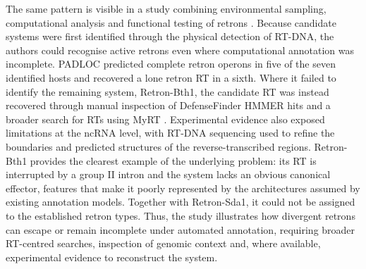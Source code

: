The same pattern is visible in a study combining environmental sampling, computational analysis and functional testing of retrons \cite{nakamura2025}. Because candidate systems were first identified through the physical detection of RT-DNA, the authors could recognise active retrons even where computational annotation was incomplete. PADLOC predicted complete retron operons in five of the seven identified hosts and recovered a lone retron RT in a sixth. Where it failed to identify the remaining system, Retron-Bth1, the candidate RT was instead recovered through manual inspection of DefenseFinder HMMER hits and a broader search for RTs using MyRT . Experimental evidence also exposed limitations at the ncRNA level, with RT-DNA sequencing used to refine the boundaries and predicted structures of the reverse-transcribed regions. Retron-Bth1 provides the clearest example of the underlying problem: its RT is interrupted by a group II intron and the system lacks an obvious canonical effector, features that make it poorly represented by the architectures assumed by existing annotation models. Together with Retron-Sda1, it could not be assigned to the established retron types. Thus, the study illustrates how divergent retrons can escape or remain incomplete under automated annotation, requiring broader RT-centred searches, inspection of genomic context and, where available, experimental evidence to reconstruct the system.

